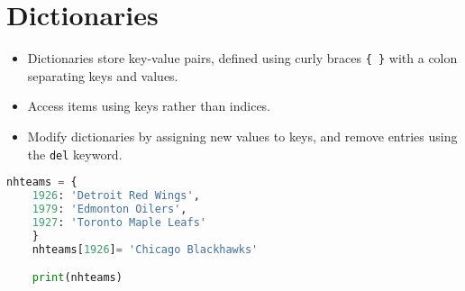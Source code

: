 \documentclass{article}
\begin{document}
\section{Dictionaries}
\begin{itemize}
    \item Dictionaries store key-value pairs, defined using curly braces \texttt{\{ \}} with a colon separating keys and values.
    \item Access items using keys rather than indices.
    \item Modify dictionaries by assigning new values to keys, and remove entries using the \texttt{del} keyword.
\end{itemize}
\begin{lstlisting}[language=python]
    nhteams = {
    1926: 'Detroit Red Wings',
    1979: 'Edmonton Oilers',
    1927: 'Toronto Maple Leafs'
    }
    nhteams[1926]= 'Chicago Blackhawks'

    print(nhteams)
\end{lstlisting}
\end{document}
